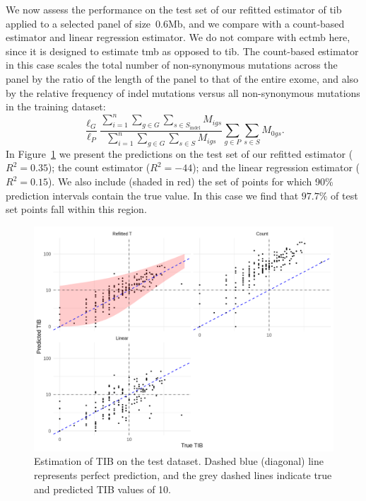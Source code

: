 \documentclass[12pt]{article}
\begin{document}
We now assess the performance on the test set of our refitted estimator of \gls{tib} applied to a selected panel of size~0.6Mb, and we compare with a count-based estimator and linear regression estimator. We do not compare with \gls{ectmb} here, since it is designed to estimate \gls{tmb} as opposed to \gls{tib}.  The count-based estimator in this case scales the total number of non-synonymous mutations across the panel by the ratio of the length of the panel to that of the entire exome, and also by the relative frequency of indel mutations versus all non-synonymous mutations in the training dataset:
\[
\frac{\ell_G}{\ell_{P}} \frac{\sum_{i =1}^{n} \sum_{g \in G} \sum_{s \in S_{\text{indel}}} M_{igs}}{\sum_{i=1}^{n}\sum_{g \in G} \sum_{s \in S} M_{igs}}\sum_{g \in P} \sum_{s \in S} M_{0gs}.
\]
In Figure~\ref{fig:indel_predictions_figure} we present the predictions on the test set of our refitted estimator ($R^2 = 0.35$); the count estimator ($R^2 = -44$); and the linear regression estimator ($R^2 = 0.15$). We also include (shaded in red) the set of points for which 90\% prediction intervals contain the true value. In this case we find that $97.7 \%$ of test set points fall within this region.

\begin{figure}[htbp]
\centering
\includegraphics[width=5.5in]{figures/fig10.png}
\vspace*{-5mm}
\caption{Estimation of TIB on the test dataset. Dashed blue (diagonal) line represents perfect prediction, and the grey dashed lines indicate true and predicted TIB values of 10. 
\label{fig:indel_predictions_figure}}
\vspace*{-2mm}
\end{figure} 
\end{document}
